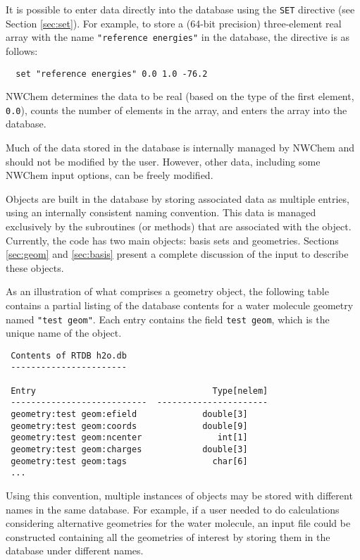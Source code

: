 \fussy

It is possible to enter data directly into the database using the
\verb+SET+ directive (see Section \ref{sec:set}).  For example, to
store a (64-bit precision) three-element real array with the name
\verb+"reference energies"+ in the database, the directive is as
follows:
\begin{verbatim}
  set "reference energies" 0.0 1.0 -76.2
\end{verbatim}
NWChem determines the data to be real (based on the type of the first
element, \verb+0.0+), counts the number of elements in the array, and
enters the array into the database.

Much of the data stored in the database is internally managed by
NWChem and should not be modified by the user.  However, other data,
including some NWChem input options, can be freely modified.

Objects are built in the database by storing associated data as
multiple entries, using an internally consistent naming convention.
This data is managed exclusively by the subroutines (or methods) that
are associated with the object.  Currently, the code has two main
objects: basis sets and geometries.  Sections \ref{sec:geom} and
\ref{sec:basis} present a complete discussion of the input to describe
these objects.

As an illustration of what comprises a geometry object, the following
table contains a partial listing of the database contents for a water
molecule geometry named \verb+"test geom"+.  Each entry contains the
field \verb+test geom+, which is the unique name of the object.

\begin{verbatim}
 Contents of RTDB h2o.db
 -----------------------

 Entry                                   Type[nelem]
 ---------------------------  ----------------------
 geometry:test geom:efield             double[3]    
 geometry:test geom:coords             double[9]    
 geometry:test geom:ncenter               int[1]    
 geometry:test geom:charges            double[3]    
 geometry:test geom:tags                 char[6]
 ...
\end{verbatim}

Using this convention, multiple instances of objects may be stored
with different names in the same database.  For example, if a user
needed to do calculations considering alternative geometries for the
water molecule, an input file could be constructed containing all the
geometries of interest by storing them in the database under different
names.

